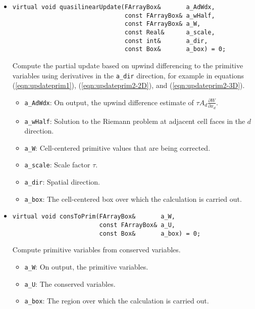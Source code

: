 \begin{itemize}
\item \begin{small}\begin{verbatim}
virtual void quasilinearUpdate(FArrayBox&       a_AdWdx,
                               const FArrayBox& a_wHalf,
                               const FArrayBox& a_W,
                               const Real&      a_scale,
                               const int&       a_dir,
                               const Box&       a_box) = 0;
\end{verbatim}\end{small}
Compute the partial update based on upwind differencing 
to the primitive variables using derivatives in the \verb/a_dir/ direction,
for example in equations (\ref{eqn:updateprim1}), (\ref{eqn:updateprim2-2D}),
and (\ref{eqn:updateprim2-3D}).
\begin{itemize}
\item \verb/a_AdWdx/: On output, the upwind difference estimate of 
$ \tau A_d \frac{\partial W}{\partial x_d}$.
\vspace{-0.07in}
\item \verb/a_wHalf/: Solution to the Riemann problem at adjacent cell
faces in the $d$ direction.
\vspace{-0.07in}
\item \verb/a_W/:  Cell-centered primitive values that are being corrected. 
\vspace{-0.07in}
\item \verb/a_scale/: Scale factor $\tau$.  
\vspace{-0.07in}
\item \verb/a_dir/: Spatial direction.
\vspace{-0.07in}
\item \verb/a_box/:  The cell-centered box over which the calculation is
carried out. 
\end{itemize}

\item \begin{small}\begin{verbatim}
virtual void consToPrim(FArrayBox&       a_W,
                        const FArrayBox& a_U,
                        const Box&       a_box) = 0;
\end{verbatim}\end{small}
Compute primitive variables from conserved variables.
\begin{itemize}
\item \verb/a_W/:  On output, the primitive variables.
\vspace{-0.07in}
\item \verb/a_U/:  The conserved variables.
\vspace{-0.07in}
\item \verb/a_box/:  The region over which the calculation is carried out.
\end{itemize}


\end{itemize}
